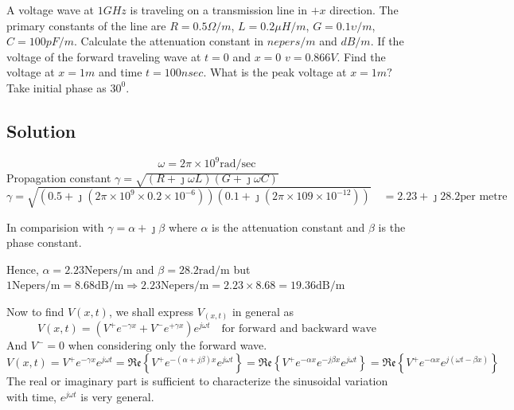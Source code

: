 \begin{exmp}
A voltage wave at ${1GH}z$ is traveling on a transmission line in ${+x}$ direction. The primary constants of the line are ${R=0.5\Omega/m}$, ${L=0.2\mu H/m}$, ${G=0.1\upsilon/m}$, ${C=100pF/m}$. Calculate the attenuation constant in ${nepers/m}$ and ${dB/m}$. If the voltage of the forward traveling wave at ${t=0}$ and ${x=0}$ ${v}=0.866V$. Find the voltage at ${x=1m}$ and time ${t=100nsec}$. What is the peak voltage at ${x=1m?}$ Take initial phase as ${30^0}$.

\subsection*{Solution}
\[\omega = 2\pi\times 10^{9}\text{rad/sec}\]
Propagation constant $\gamma = \sqrt{(R + \jmath\omega L)(G + \jmath\omega C)}$
\begin{dmath*}
\gamma
=\sqrt{(0.5 + \jmath( 2\pi\times 10^{9} \times 0.2\times 10^{-6}))(0.1 + \jmath (2\pi\times 10{9} \times 10^{-12}))} \quad
= 2.23 + \jmath 28.2 \text{per metre}
\end{dmath*}
 
In comparision with $\gamma = \alpha + \jmath\beta$ where $\alpha$  is the attenuation constant and $\beta$ is the phase constant.

Hence, $\alpha = 2.23 \text{Nepers/m} $ and $\beta = 28.2 \text{rad/m}$ but $1 \text{Nepers/m} = 8.68\text{dB/m}\Rightarrow 2.23 \text{Nepers/m} = 2.23\times8.68= 19.36 \text{dB/m}$

Now to find $V{(x,t)}$, we shall express $V_{(x,t)}$ in general as
\begin{dmath*}
V{(x,t)} = (V^{+}e^{-\gamma x} + V^{-}e^{+\gamma x})e^{j\omega t}\quad\text{for forward and backward wave}
\end{dmath*}
And $ V^{-} = 0 $ when considering only the forward wave.
\begin{dmath*}
V{(x,t)} = V^{+}e^{-\gamma x}e^{j\omega t}
= \mathfrak{Re}\left\lbrace{V^{+}e^{-(\alpha +j\beta)x}e^{j\omega t}}\right\rbrace
=\mathfrak{Re}\left\lbrace{V^{+}e^{-\alpha x}e^{-j\beta x}e^{j\omega t}}\right\rbrace
= \mathfrak{Re}\left\lbrace{V^{+}e^{-\alpha x}e^{j(\omega t - \beta x)}}\right\rbrace
\end{dmath*}
The real or imaginary part is sufficient to characterize the sinusoidal variation with time, ${e^{j\omega t}}$ is very general.


\end{exmp}
